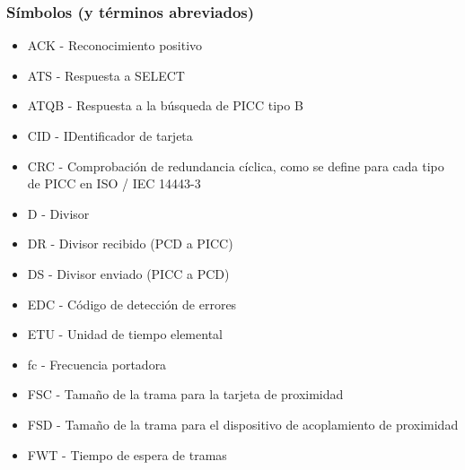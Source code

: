 \subsubsection{Símbolos (y términos abreviados)}
\begin{itemize}
	\item ACK - Reconocimiento positivo\par

	\item ATS - Respuesta a SELECT\par

	\item ATQB - Respuesta a la búsqueda de PICC tipo B\par

	\item CID - IDentificador de tarjeta\par

	\item CRC - Comprobación de redundancia cíclica, como se define para cada tipo de PICC en ISO / IEC 14443-3\par

	\item D - Divisor\par

	\item DR - Divisor recibido (PCD a PICC)\par

	\item DS - Divisor enviado (PICC a PCD)\par

	\item EDC - Código de detección de errores\par

	\item ETU - Unidad de tiempo elemental\par

	\item fc - Frecuencia portadora\par

	\item FSC - Tamaño de la trama para la tarjeta de proximidad\par

	\item FSD - Tamaño de la trama para el dispositivo de acoplamiento de proximidad\par

	\item FWT - Tiempo de espera de tramas\par


\end{itemize}

